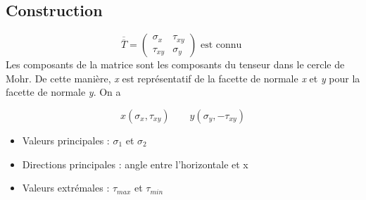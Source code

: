 \subsection*{Construction}
\begin{equation}
	\overline{\overline{T}} = 
	\left(	
	\begin{array}{cc}
		\sigma _x  & \tau _{xy} \\ 
		\tau _{xy} & \sigma _y  
	\end{array}
	\right) \mbox{ est connu }
\end{equation}
Les composants de la matrice sont les composants du tenseur dans le cercle de Mohr. De cette manière, \textit{x} est représentatif de la facette de normale \textit{x} et \textit{y} pour la facette de normale \textit{y}. On a

\begin{equation}
	x(\sigma _x , \tau _{xy}) \qquad y(\sigma _y, - \tau _{xy})
\end{equation}

\begin{itemize}
	\item Valeurs principales : $\sigma _1$ et $\sigma _2$
	\item Directions principales : angle entre l'horizontale et x
	\item Valeurs extrémales : $\tau _{max}$ et $\tau _{min}$
\end{itemize}